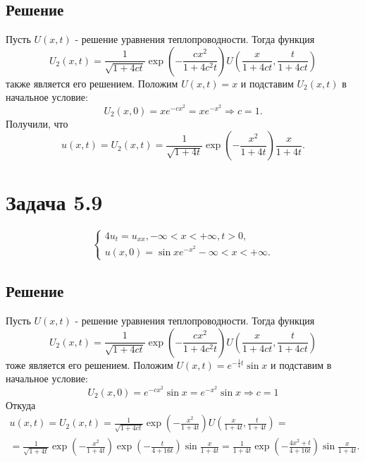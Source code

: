 \documentclass[11pt]{article}
\begin{document}
\subsection{Решение}
\label{sec:orgd05d00a}
Пусть $U(x, t)$ - решение уравнения теплопроводности. Тогда функция
\begin{equation*}
U_2(x, t) = \frac1{\sqrt{1 + 4ct}}\exp\left(-\frac{cx^2}{1 + 4c^2t}\right)U\left(\frac{x}{1 + 4ct}, \frac{t}{1 + 4ct}\right)
\end{equation*}
также является его решением. Положим $U(x, t) = x$ и подставим $U_2(x, t)$ в начальное условие:
\begin{equation}
U_2(x, 0) = xe^{-cx^2} = xe^{-x^2} \Rightarrow c = 1.
\end{equation}
Получили, что
\begin{equation}
u(x, t) = U_2(x, t) = \frac1{\sqrt{1 + 4t}}\exp\left(-\frac{x^2}{1 + 4t}\right)\frac{x}{1 + 4t}.
\end{equation}
\section{Задача 5.9}
\label{sec:org20cad16}
\begin{equation}
\begin{cases}
4u_t = u_{xx}, -\infty < x < +\infty, t > 0, \\
u(x, 0) = \sin xe^{-x^2} -\infty < x < +\infty.
\end{cases}
\end{equation}
\subsection{Решение}
\label{sec:org93bfe3c}
Пусть $U(x, t)$ - решение уравнения теплопроводности. Тогда функция
\begin{equation*}
U_2(x, t) = \frac1{\sqrt{1 + 4ct}}\exp\left(-\frac{cx^2}{1 + 4c^2t}\right)U\left(\frac{x}{1 + 4ct}, \frac{t}{1 + 4ct}\right)
\end{equation*}
тоже является его решением. Положим $U(x, t) = e^{-\frac14t}\sin x$ и подставим в начальное условие:
\begin{equation*}
U_2(x, 0) = e^{-cx^2}\sin x = e^{-x^2}\sin x \Rightarrow c = 1
\end{equation*}
Откуда
\begin{multline}
u(x, t) = U_2(x, t) = \frac1{\sqrt{1 + 4ct}}\exp\left(-\frac{x^2}{1 + 4t}\right)U\left(\frac{x}{1 + 4t}, \frac{t}{1 + 4t}\right) = \\
= \frac1{\sqrt{1 + 4t}}\exp\left(-\frac{x^2}{1 + 4t}\right)\exp\left(-\frac{t}{4 + 16t}\right)\sin\frac{x}{1 + 4t} =
\frac1{1 + 4t}\exp\left(-\frac{4x^2 + t}{4 + 16t}\right)\sin\frac{x}{1 + 4t}.
\end{multline}
\end{document}
